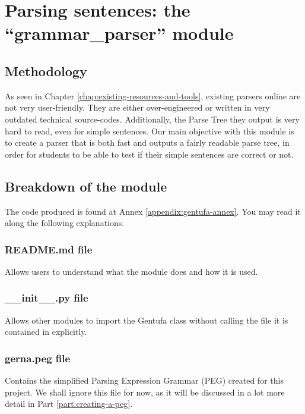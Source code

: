 \chapter{Parsing sentences: the ``grammar\_parser'' module}
\label{chap:parser}

\section{Methodology}

As seen in Chapter \ref{chap:existing-resources-and-tools}, existing parsers online are not very user-friendly. They are either
over-engineered or written in very outdated technical source-codes. Additionally, the Parse Tree they output is very hard to read,
even for simple sentences. Our main objective with this module is to create a parser that is both fast and outputs a fairly readable parse tree,
in order for students to be able to test if their simple sentences are correct or not.

\section{Breakdown of the module}
\label{sec:parsing_lojban_sentences}

The code produced is found at Annex \ref{appendix:gentufa-annex}. You may read it along the following explanations.

\subsection*{README.md file}

Allows users to understand what the module does and how it is used.

\subsection*{\_\_init\_\_.py file}

Allows other modules to import the Gentufa class without calling the file it is contained in explicitly.

\subsection*{gerna.peg file}

Contains the simplified Parsing Expression Grammar (PEG) created for this project.
We shall ignore this file for now, as it will be discussed in a lot more detail in Part \ref{part:creating-a-peg}.

